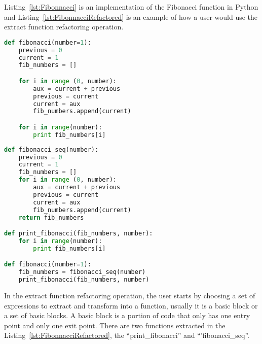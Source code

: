 

Listing~\ref{lst:Fibonnacci} is an implementation of the Fibonacci function in Python and Listing~\ref{lst:FibonnacciRefactored} is an example of how a user would use the extract function refactoring operation.

\begin{lstlisting}[frame=single, caption=Fibonacci function first implementation, label={lst:Fibonnacci}, language=Python]
def fibonacci(number=1):
	previous = 0
	current = 1
	fib_numbers = []

	for i in range (0, number):
		aux = current + previous
		previous = current
		current = aux
		fib_numbers.append(current)

	for i in range(number):
		print fib_numbers[i]
\end{lstlisting}


\begin{lstlisting}[frame=single, caption=Fibonacci function after using extract function, label={lst:FibonnacciRefactored}, language=Python]
def fibonacci_seq(number):
	previous = 0
	current = 1
	fib_numbers = []
	for i in range (0, number):
		aux = current + previous
		previous = current
		current = aux
		fib_numbers.append(current)
	return fib_numbers

def print_fibonacci(fib_numbers, number):
	for i in range(number):
		print fib_numbers[i]

def fibonacci(number=1):
	fib_numbers = fibonacci_seq(number)
	print_fibonacci(fib_numbers, number)
\end{lstlisting}


In the extract function refactoring operation, the user starts by choosing a set of expressions to extract and transform into a function, usually it is a  basic block or a set of basic blocks.
A basic block is a portion of code that only has one entry point and only one exit point.
There are two functions extracted in the Listing~\ref{lst:FibonnacciRefactored}, the ``print\_fibonacci'' and ``'fibonacci\_seq''.

